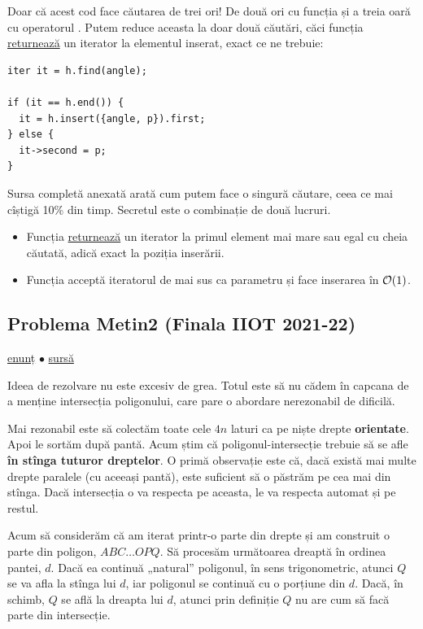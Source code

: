 \documentclass[../main.tex]{subfiles}
\begin{document}
Doar că acest cod face căutarea de trei ori! De două ori cu funcția  și a treia oară cu operatorul \ccode{[]}. Putem reduce aceasta la doar două căutări, căci funcția  \href{https://en.cppreference.com/w/cpp/container/map/insert}{returnează} un iterator la elementul inserat, exact ce ne trebuie:

\begin{verbatim}
iter it = h.find(angle);

if (it == h.end()) {
  it = h.insert({angle, p}).first;
} else {
  it->second = p;
}
\end{verbatim}

Sursa completă anexată arată cum putem face o singură căutare, ceea ce mai cîștigă 10\% din timp. Secretul este o combinație de două lucruri.

\begin{itemize}
  \item Funcția  \href{https://en.cppreference.com/w/cpp/container/map/lower_bound}{returnează} un iterator la primul element mai mare sau egal cu cheia căutată, adică exact la poziția inserării.
  \item Funcția  acceptă iteratorul de mai sus ca parametru și face inserarea în $\mathcal{O}(1)$.
\end{itemize}

\subsection{Problema Metin2 (Finala IIOT 2021-22)}
\label{problem:metin2}

\href{https://kilonova.ro/problems/348}{enunț}
$\bullet$
\hyperref[code:metin2]{sursă}

Ideea de rezolvare nu este excesiv de grea. Totul este să nu cădem în capcana de a menține intersecția poligonului, care pare o abordare nerezonabil de dificilă.

Mai rezonabil este să colectăm toate cele $4n$ laturi ca pe niște drepte \textbf{orientate}. Apoi le sortăm după pantă. Acum știm că poligonul-intersecție trebuie să se afle \textbf{în stînga tuturor dreptelor}. O primă observație este că, dacă există mai multe drepte paralele (cu aceeași pantă), este suficient să o păstrăm pe cea mai din stînga. Dacă intersecția o va respecta pe aceasta, le va respecta automat și pe restul.

Acum să considerăm că am iterat printr-o parte din drepte și am construit o parte din poligon, $ABC \dots OPQ$. Să procesăm următoarea dreaptă în ordinea pantei, $d$. Dacă ea continuă „natural” poligonul, în sens trigonometric, atunci $Q$ se va afla la stînga lui $d$, iar poligonul se continuă cu o porțiune din $d$. Dacă, în schimb, $Q$ se află la dreapta lui $d$, atunci prin definiție $Q$ nu are cum să facă parte din intersecție.
\end{document}
